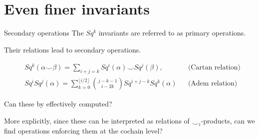 \documentclass[10pt,t]{beamer} %
\begin{document}
\section{Even finer invariants}

\begin{frame}{Secondary operations}
	The $Sq^k$ invariants are referred to as primary operations.
	
	\vskip 10pt
	
	Their relations lead to secondary operations.
	
	\pause
	
	\begin{align*}
	& Sq^k(\alpha \smallsmile \beta) = \sum_{i+j=k} Sq^i(\alpha) \smallsmile Sq^j(\beta), &&
	\text{(Cartan relation)} \\	
	& Sq^i Sq^j(\alpha) = \sum_{k=0}^{\lfloor i/2 \rfloor} {j-k-1 \choose i-2k} Sq^{i+j-k} Sq^k(\alpha) &&
	\text{(Adem relation)}
	\end{align*}
	
	\vskip 5pt
	\textcolor{pblue}{Can these by effectively computed?}
	\vskip 10pt
	
	\pause
	
	More explicitly, since these can be interpreted as relations of $\smallsmile_i$-products, can we find operations enforcing them at the cochain level?
\end{frame}
\end{document}
